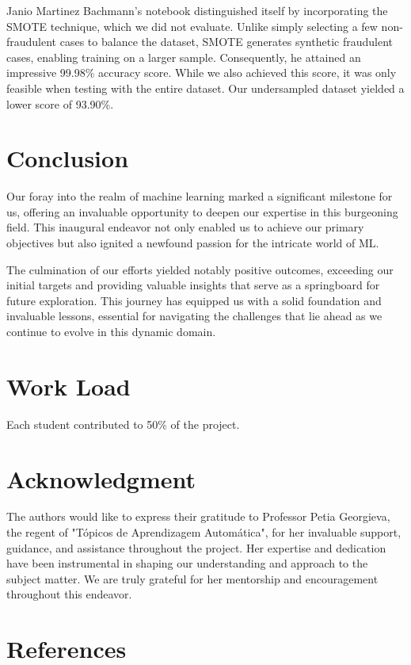 \documentclass[conference]{IEEEtran}
\begin{document}
Janio Martinez Bachmann's notebook distinguished itself by incorporating the SMOTE technique, which we did not evaluate. Unlike simply selecting a few non-fraudulent cases to balance the dataset, SMOTE generates synthetic fraudulent cases, enabling training on a larger sample. Consequently, he attained an impressive 99.98\% accuracy score. While we also achieved this score, it was only feasible when testing with the entire dataset. Our undersampled dataset yielded a lower score of 93.90\%.

\section{Conclusion}

Our foray into the realm of machine learning marked a significant milestone for us, offering an invaluable opportunity to deepen our expertise in this burgeoning field. This inaugural endeavor not only enabled us to achieve our primary objectives but also ignited a newfound passion for the intricate world of ML. 

The culmination of our efforts yielded notably positive outcomes, exceeding our initial targets and providing valuable insights that serve as a springboard for future exploration. This journey has equipped us with a solid foundation and invaluable lessons, essential for navigating the challenges that lie ahead as we continue to evolve in this dynamic domain.

\section{Work Load}

Each student contributed to 50\% of the project.

\section{Acknowledgment}
The authors would like to express their gratitude to Professor Petia Georgieva, the regent of "Tópicos de Aprendizagem Automática", for her invaluable support, guidance, and assistance throughout the project. Her expertise and dedication have been instrumental in shaping our understanding and approach to the subject matter. We are truly grateful for her mentorship and encouragement throughout this endeavor.

\section{References}
\end{document}
